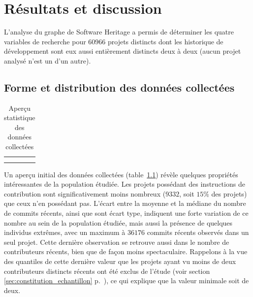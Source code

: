 \chapter{Résultats et discussion}

\captionsetup[figure]{format=plain,singlelinecheck=true,justification=centering}
\captionsetup[subfigure]{format=plain,singlelinecheck=true,justification=centering}
\captionsetup[table]{format=plain,singlelinecheck=true,justification=centering}

L'analyse du graphe de Software Heritage a permis de déterminer les quatre variables de recherche pour
$60 966$ projets distincts dont les historique de développement sont eux aussi entièrement distincts deux à
deux (aucun projet analysé n'est un  d'un autre).

\section{Forme et distribution des données collectées}

\begin{table}[ht]
    \centering
    \begin{tabular}{cc}
         &
        
        \\
         &
        
    \end{tabular}
    \caption{Aperçu statistique des données collectées}
    \label{tab:data_description}
\end{table}

Un aperçu initial des données collectées (table~\ref{tab:data_description}) révèle quelques propriétés
intéressantes de la population étudiée. Les projets possédant des instructions de contribution sont
significativement moins nombreux ($9 332$, soit $15\%$ des projets) que ceux n'en possédant pas. L'écart entre
la moyenne et la médiane du nombre de \glspl{commit} récents, ainsi que sont écart type, indiquent une forte
variation de ce nombre au sein de la population étudiée, mais aussi la présence de quelques individus
extrêmes, avec un maximum à $36 176$ \glspl{commit} récents observés dans un seul projet. Cette dernière
observation se retrouve aussi dans le nombre de contributeurs récents, bien que de façon moins spectaculaire.
Rappelons à la vue des quantiles de cette dernière valeur que les projets ayant vu moins de deux contributeurs
distincts récents ont été exclus de l'étude (voir section \ref{sec:constitution_echantillon}
p.~\pageref{sec:constitution_echantillon}), ce qui explique que la valeur minimale soit de deux.

